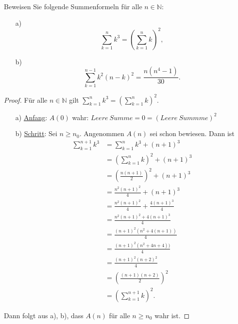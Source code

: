 \documentclass{../problemset}
\begin{document}
\maketitle

\begin{problem}[Summenformeln]
Beweisen Sie folgende Summenformeln für alle $n \in \mathbb{N}$:
\begin{enumerate}
	\item[a)]
	      \[
		      \sum_{k = 1}^{n} k^3 = \left(\sum_{k = 1}^{n}k\right)^2,
	      \]
	\item[b)]
	      \[
		      \sum_{k = 1}^{n-1} k^2(n-k)^2 = \frac{n(n^4-1)}{30}.
	      \]
\end{enumerate}
\begin{proof}
	Für alle $n \in \mathbb{N}$ gilt $\sum_{k = 1}^{n} k^3 = \left(\sum_{k = 1}^{n}k\right)^2$.
	\begin{enumerate}
		\item[a)] \underline{Anfang}: $A(0)$ wahr: $Leere\ Summe = 0 = (Leere\ Summme)^2$
		\item[b)] \underline{Schritt}: Sei $n \ge n_0$. Angenommen $A(n)$ sei schon bewiesen.
		      Dann ist \begin{align}
			      \sum_{k = 1}^{n + 1} k^3 & = \sum_{k = 1}^{n}k^3 + (n + 1)^3                                           \\
			                               & = \left(\sum_{k = 1}^{n}k\right)^2 + (n + 1)^3 \tag{Gausische summenformel} \\
			                               & = \left(\frac{n(n+1)}{2}\right)^2 + (n + 1)^3                               \\
			                               & = \frac{n^2(n+1)^2}{4} + (n + 1)^3                                          \\
			                               & = \frac{n^2(n+1)^2}{4} + \frac{4(n + 1)^3}{4}                               \\
			                               & = \frac{n^2(n+1)^2 + 4(n + 1)^3}{4}                                         \\
			                               & = \frac{(n+1)^2(n^2 + 4(n + 1))}{4}                                         \\
			                               & = \frac{(n+1)^2(n^2 + 4n + 4))}{4}                                          \\
			                               & = \frac{(n+1)^2(n +2)^2}{4}                                                 \\
			                               & = \left(\frac{(n+1)(n +2)}{2}\right)^2                                      \\
			                               & = \left(\sum_{k=1}^{n+1}k\right)^2.
		      \end{align}
	\end{enumerate}
	Dann folgt aus a), b), dass $A(n)$ für alle $n \ge n_0$ wahr ist.
\end{proof}


\end{problem}
\end{document}
